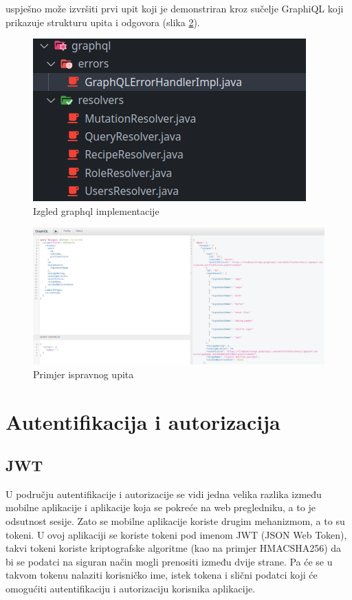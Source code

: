 \documentclass[times, utf8, zavrsni]{fer}
\begin{document}
uspješno može izvršiti prvi upit koji je demonstriran kroz sučelje GraphiQL koji
prikazuje strukturu upita i odgovora (slika \ref{fig:GraphQL query}).
\begin{figure}[h]
      \centering
      \includegraphics[width=.5\textwidth]{graphql_implementation_classes.png}
      \caption{Izgled graphql implementacije}
      \label{fig:GraphQL implementation}
\end{figure}
\begin{figure}[h]
      \centering
      \includegraphics[width=\textwidth]{graphql_query.png}
      \caption{Primjer ispravnog upita}
      \label{fig:GraphQL query}
\end{figure}


\section{Autentifikacija i autorizacija}

\subsection{JWT}
U području autentifikacije i autorizacije se vidi jedna velika razlika između mobilne aplikacije i aplikacije koja
se pokreće na web pregledniku, a to je odsutnost sesije. Zato se mobilne aplikacije koriste drugim mehanizmom, a
to su tokeni. U ovoj aplikaciji se koriste tokeni pod imenom JWT (JSON Web Token), takvi tokeni koriste
kriptografske algoritme (kao na primjer HMACSHA256) da bi se podatci na siguran način mogli prenositi između dvije strane.
Pa će se u takvom tokenu nalaziti korisničko ime, istek tokena i slični podatci koji će omogućiti
autentifikaciju i autorizaciju korisnika aplikacije.
\end{document}
